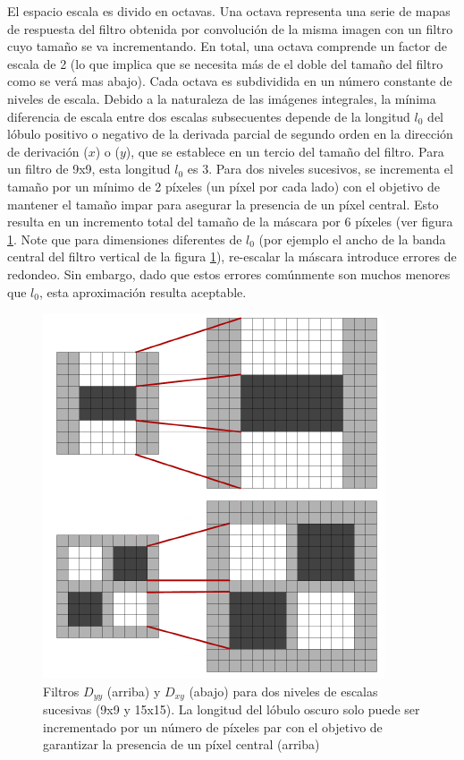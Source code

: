 El espacio escala es divido en octavas. Una octava representa una serie de mapas de respuesta del filtro obtenida por convolución de la misma imagen con un filtro cuyo tamaño se va incrementando. En total, una octava comprende un factor de escala de 2 (lo que implica que se necesita más de el doble del tamaño del filtro como se verá mas abajo). Cada octava es subdividida en un número constante de niveles de escala. Debido a la naturaleza de las imágenes integrales, la mínima diferencia de escala entre dos escalas subsecuentes depende de la longitud $l_0$ del lóbulo positivo o negativo de la derivada parcial de segundo orden en la dirección de derivación ($\mathit{x}$) o ($\mathit{y}$), que se establece en un tercio del tamaño del filtro. Para un filtro de 9x9, esta longitud $l_{0}$ es 3. Para dos niveles sucesivos, se incrementa el tamaño por un mínimo de 2 píxeles (un píxel por cada lado) con el objetivo de mantener el tamaño impar para asegurar la presencia de un píxel central. Esto resulta en un incremento total del tamaño de la máscara por 6 píxeles (ver figura \ref{fig:filterincrementsize}. Note que para dimensiones diferentes de $l_{0}$ (por ejemplo el ancho de la banda central del filtro vertical de la figura \ref{fig:filterincrementsize}), re-escalar la máscara introduce errores de redondeo. Sin embargo, dado que estos errores comúnmente son muchos menores que $l_{0}$, esta aproximación resulta aceptable.
\begin{figure}[tbhp]
   \centering
        \includegraphics[scale=0.4]{./figs/filterincrementsize}
    \caption[]{Filtros $\mathit{D}_{yy}$ (arriba) y $\mathit{D}_{xy}$ (abajo) para dos niveles de escalas sucesivas (9x9 y 15x15). La longitud del lóbulo oscuro solo puede ser incrementado por un número de píxeles par con el objetivo de garantizar la presencia de un píxel central (arriba) }
   \label{fig:filterincrementsize}                %
\end{figure}

